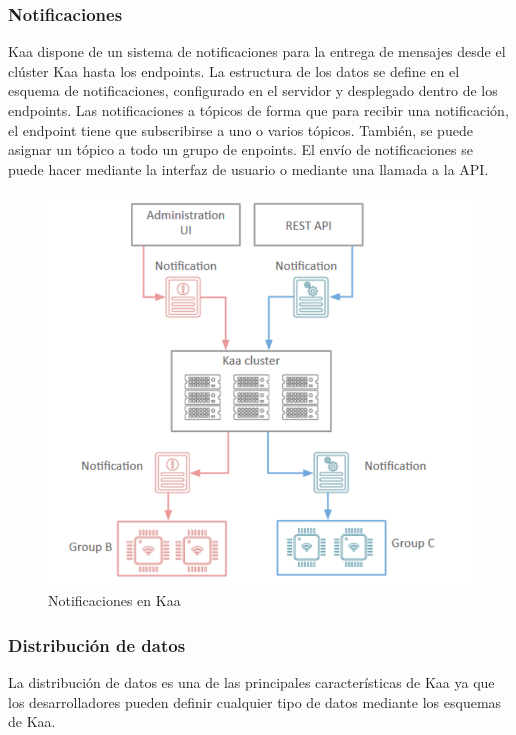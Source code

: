 \documentclass[12pt, twoside]{book}
\begin{document}
\subsubsection*{Notificaciones}
Kaa dispone de un sistema de notificaciones para la entrega de mensajes desde el clúster Kaa hasta los endpoints. La estructura de los datos se define en el esquema de notificaciones, configurado en el servidor y desplegado dentro de los endpoints. Las notificaciones a tópicos de forma que para recibir una notificación, el endpoint tiene que subscribirse a uno o varios tópicos. También, se puede asignar un tópico a todo un grupo de enpoints. El envío de notificaciones se puede hacer mediante la interfaz de usuario o mediante una llamada a la API. 
\begin{figure}[H]
\centering
\includegraphics[scale=0.5]{images/notifications}
\caption{Notificaciones en Kaa}\label{L508}
\end{figure}
\subsubsection*{Distribución de datos}
La distribución de datos es una de las principales características de Kaa ya que los desarrolladores pueden definir cualquier tipo de datos mediante los esquemas de Kaa.
\end{document}

